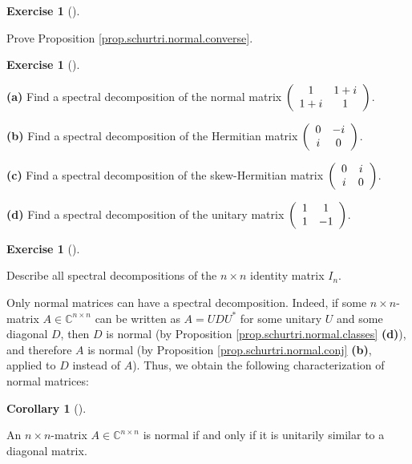 \documentclass[numbers=enddot,12pt,final,onecolumn,notitlepage]{scrartcl}%
\newcounter{exer}
\numberwithin{exer}{subsection}
\theoremstyle{definition}
\newtheorem{coro}[theo]{Corollary}
\newenvironment{corollary}[1][]
{\begin{coro}[#1]\begin{leftbar}}
{\end{leftbar}\end{coro}}
\newtheorem{exmp}[exer]{Exercise}
\newenvironment{exercise}[1][]
{\begin{exmp}[#1]\begin{leftbar}}
{\end{leftbar}\end{exmp}}
\begin{document}
\begin{exercise}
 Prove Proposition \ref{prop.schurtri.normal.converse}.
\end{exercise}

\begin{exercise}
\label{exe.schurtri.normal.examples} \textbf{(a)} Find a spectral
decomposition of the normal matrix $\left(
\begin{array}
[c]{cc}%
1 & 1+i\\
1+i & 1
\end{array}
\right)  $.

\textbf{(b)} Find a spectral decomposition of the Hermitian matrix $\left(
\begin{array}
[c]{cc}%
0 & -i\\
i & 0
\end{array}
\right)  $.

\textbf{(c)} Find a spectral decomposition of the skew-Hermitian matrix
$\left(
\begin{array}
[c]{cc}%
0 & i\\
i & 0
\end{array}
\right)  $.

\textbf{(d)} Find a spectral decomposition of the unitary matrix $\left(
\begin{array}
[c]{cc}%
1 & 1\\
1 & -1
\end{array}
\right)  $.
\end{exercise}

\begin{exercise}
 Describe all spectral decompositions of the $n\times n$ identity
matrix $I_{n}$.
\end{exercise}

Only normal matrices can have a spectral decomposition. Indeed, if some
$n\times n$-matrix $A\in\mathbb{C}^{n\times n}$ can be written as
$A=UDU^{\ast}$ for some unitary $U$ and some diagonal $D$, then $D$ is normal
(by Proposition \ref{prop.schurtri.normal.classes} \textbf{(d)}), and
therefore $A$ is normal (by Proposition \ref{prop.schurtri.normal.conj}
\textbf{(b)}, applied to $D$ instead of $A$). Thus, we obtain the following
characterization of normal matrices:

\begin{corollary}
\label{cor.schurtri.normal.normal-iff}An $n\times n$-matrix $A\in
\mathbb{C}^{n\times n}$ is normal if and only if it is unitarily similar to a
diagonal matrix.
\end{corollary}
\end{document}
